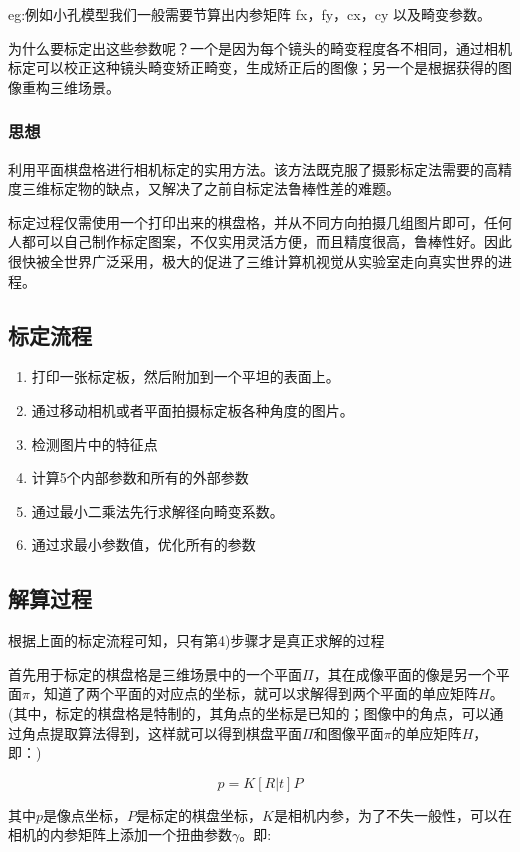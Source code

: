 \documentclass{lzureport}
\begin{document}
eg:例如小孔模型我们一般需要节算出内参矩阵 fx，fy，cx，cy 以及畸变参数。

为什么要标定出这些参数呢？一个是因为每个镜头的畸变程度各不相同，通过相机标定可以校正这种镜头畸变矫正畸变，生成矫正后的图像；另一个是根据获得的图像重构三维场景。

\subsubsection{思想}
利用平面棋盘格进行相机标定的实用方法。该方法既克服了摄影标定法需要的高精度三维标定物的缺点，又解决了之前自标定法鲁棒性差的难题。

标定过程仅需使用一个打印出来的棋盘格，并从不同方向拍摄几组图片即可，任何人都可以自己制作标定图案，不仅实用灵活方便，而且精度很高，鲁棒性好。因此很快被全世界广泛采用，极大的促进了三维计算机视觉从实验室走向真实世界的进程。


\subsection{标定流程}
\begin{enumerate}[label=\arabic*)]
	\item 打印一张标定板，然后附加到一个平坦的表面上。
	\item 通过移动相机或者平面拍摄标定板各种角度的图片。
	\item 检测图片中的特征点
	\item 计算5个内部参数和所有的外部参数
	\item 通过最小二乘法先行求解径向畸变系数。
	\item 通过求最小参数值，优化所有的参数
\end{enumerate}

\subsection{解算过程}
根据上面的标定流程可知，只有第4)步骤才是真正求解的过程

首先用于标定的棋盘格是三维场景中的一个平面$\Pi$，其在成像平面的像是另一个平面$\pi$，知道了两个平面的对应点的坐标，就可以求解得到两个平面的单应矩阵$H$。\\
(其中，标定的棋盘格是特制的，其角点的坐标是已知的；图像中的角点，可以通过角点提取算法得到，这样就可以得到棋盘平面$\Pi$和图像平面$\pi$的单应矩阵$H$，即：)

$$p=K[R|t]P$$

其中$p$是像点坐标，$P$是标定的棋盘坐标，$K$是相机内参，为了不失一般性，可以在相机的内参矩阵上添加一个扭曲参数$\gamma$。即:
\end{document}

